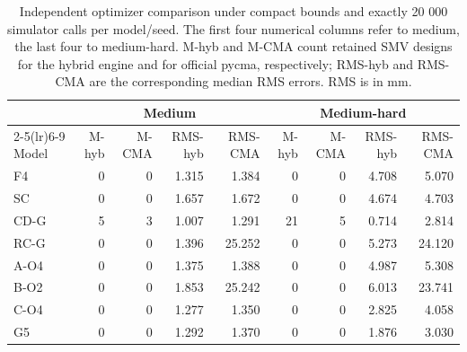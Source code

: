 \begin{table}[H]
\caption{Independent optimizer comparison under compact bounds and exactly 20 000 simulator calls per model/seed. The first four numerical columns refer to medium, the last four to medium-hard. M-hyb and M-CMA count retained SMV designs for the hybrid engine and for official pycma, respectively; RMS-hyb and RMS-CMA are the corresponding median RMS errors. RMS is in mm.}
\label{tab:v2_independent}
\centering
\small
\setlength{\tabcolsep}{4.5pt}
\begin{tabular}{@{}lrrrrrrrr@{}}
\toprule
& \multicolumn{4}{c}{Medium} & \multicolumn{4}{c}{Medium-hard} \\ \cmidrule(lr){2-5}\cmidrule(lr){6-9} Model & M-hyb & M-CMA & RMS-hyb & RMS-CMA & M-hyb & M-CMA & RMS-hyb & RMS-CMA \\
\midrule
F4 & 0 & 0 & 1.315 & 1.384 & 0 & 0 & 4.708 & 5.070 \\
SC & 0 & 0 & 1.657 & 1.672 & 0 & 0 & 4.674 & 4.703 \\
CD-G & 5 & 3 & 1.007 & 1.291 & 21 & 5 & 0.714 & 2.814 \\
RC-G & 0 & 0 & 1.396 & 25.252 & 0 & 0 & 5.273 & 24.120 \\
A-O4 & 0 & 0 & 1.375 & 1.388 & 0 & 0 & 4.987 & 5.308 \\
B-O2 & 0 & 0 & 1.853 & 25.242 & 0 & 0 & 6.013 & 23.741 \\
C-O4 & 0 & 0 & 1.277 & 1.350 & 0 & 0 & 2.825 & 4.058 \\
G5 & 0 & 0 & 1.292 & 1.370 & 0 & 0 & 1.876 & 3.030 \\
\bottomrule
\end{tabular}
\end{table}
